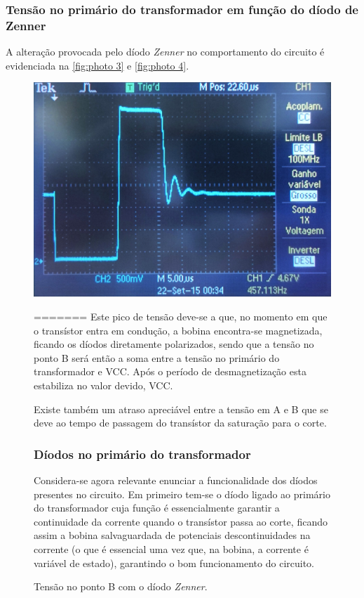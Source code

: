 \documentclass[a4paper,11pt]{article}
\numberwithin{equation}{section}
\begin{document}
\subsubsection{Tensão no primário do transformador em função do díodo de Zenner}

A alteração provocada pelo díodo \textit{Zenner} no comportamento do circuito é evidenciada na \autoref{fig:photo 3} e \autoref{fig:photo 4}.

\begin{figure}[h]
	\centering
	\includegraphics[keepaspectratio=true, scale=0.15]{img/DSC0118}
	\caption{Tensão no ponto B com o díodo \textit{Zenner}.}
	\label{fig:photo 3}
=======
Este pico de tensão deve-se a que, no momento em que o transístor entra em condução, a bobina encontra-se magnetizada, ficando os díodos diretamente polarizados, sendo que a tensão no ponto B será então a soma entre a tensão no primário do transformador e VCC. Após o período de desmagnetização esta estabiliza no valor devido, VCC. 

Existe também um atraso apreciável entre a tensão em A e B que se deve ao tempo de passagem do transístor da saturação para o corte.

\subsubsection{Díodos no primário do transformador}

Considera-se agora relevante enunciar a funcionalidade dos díodos presentes no circuito. Em primeiro tem-se o díodo ligado ao primário do transformador cuja função é essencialmente garantir a continuidade da corrente quando o transístor passa ao corte, ficando assim a bobina salvaguardada de potenciais descontinuidades na corrente (o que é essencial uma vez que, na bobina, a corrente é variável de estado), garantindo o bom funcionamento do circuito. 


\end{figure}
\end{document}
